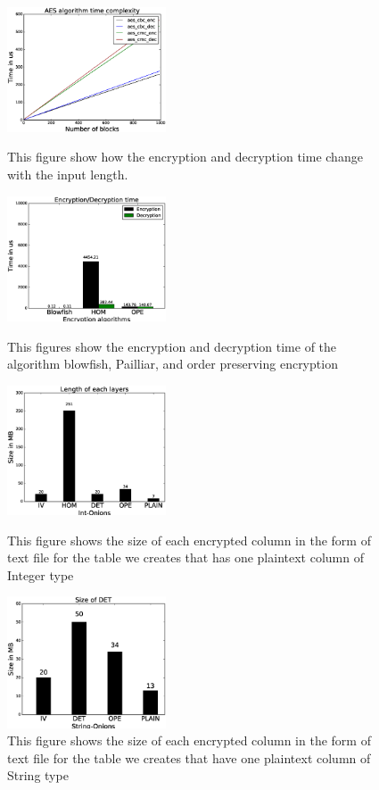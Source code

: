 \begin{figure}   
  \begin{minipage}[t]{0.5\columnwidth}  
    \centering
    \includegraphics[width=4.7cm]{images/aes.eps}  
     
    \caption{\small{This figure show how the encryption and decryption time change with the input length.}}  
    \label{fig:stack9}   
  \end{minipage}%
  \hfill  
  \begin{minipage}[t]{0.5\columnwidth}
    \centering   
    \includegraphics[width=4.7cm]{images/time.eps}   
    \caption{\small{This figures show the encryption and decryption time of the algorithm blowfish, Pailliar, and order preserving encryption}}  
    \label{fig:stack10}   
  \end{minipage}
  \hfill
  \begin{minipage}[t]{0.5\columnwidth}  
    \centering   

    \includegraphics[width=4.7cm]{images/size-of-each-onion.eps}   
    \caption{\small{This figure shows the size of each encrypted column in the form of text file for the table we creates that has one plaintext column of Integer type}} 
    \label{fig:stack11}   
  \end{minipage}%
  \hfill 
  \begin{minipage}[t]{0.5\columnwidth}   
    \centering   
    \includegraphics[width=4.7cm]{images/det-rnd.eps}   
    \caption{\small{This figure shows the size of each encrypted column in the form of text file for the table we creates that have one plaintext column of String type}} 
    \label{fig:stack12}   


\end{minipage}
\end{figure}
